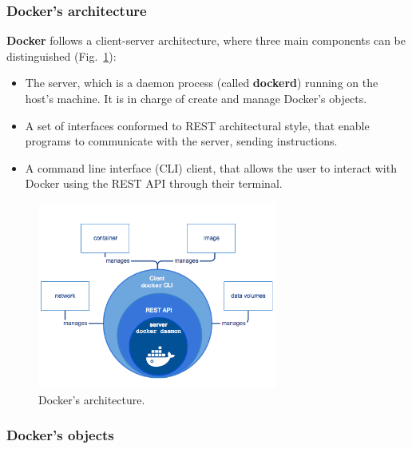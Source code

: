 \documentclass[a4paper,12pt]{article}
\def\myfig#1{Fig.~#1\xspace}
\begin{document}
\subsubsection{Docker's architecture\cite{docker_architecture}}

\textbf{Docker} follows a client-server architecture, where three main
components can be distinguished (\myfig{\ref{fig:docker-architecture}}):
\begin{itemize}
  \item The server, which is a daemon process (called \textbf{dockerd}) running
  on the host's machine. It is in charge of create and manage Docker's objects.
  \item A set of interfaces conformed to REST architectural style, that enable
  programs to communicate with the server, sending instructions.
  \item A command line interface (CLI) client, that allows the user to interact
  with Docker using the REST API through their terminal.
\end{itemize}   

\begin{figure}[h]
  \centerline{\includegraphics[width=0.7\textwidth]{engine-components-flow.png}}
  \caption{Docker's architecture.}
  \label{fig:docker-architecture}
  \end{figure}

\subsubsection{Docker's objects\cite{docker_objects}}
\end{document}
